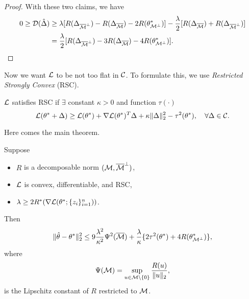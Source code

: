 \begin{proof}
    With these two claims, we have
    \begin{equation}
    \begin{split}
    0 \ge \mathcal{D}({\hat\Delta}) & \ge \lambda[R(\Delta_{{\overline{\mathcal{M}}}^\perp})-R(\Delta_{{\overline{\mathcal{M}}}})-2R(\theta^*_{\mathcal{M}^\perp})]
        -\frac{\lambda}{2}[R(\Delta_{{\overline{\mathcal{M}}}})+R(\Delta_{{\overline{\mathcal{M}}}^\perp})]  \\
    & = \frac{\lambda}{2}[R(\Delta_{{\overline{\mathcal{M}}}^\perp})-3R(\Delta_{{\overline{\mathcal{M}}}})-4R(\theta^*_{\mathcal{M}^\perp})].
    \end{split}
    \end{equation}
\end{proof}

Now we want $\mathcal{L}$ to be not too flat in $\mathcal{C}$.
To formulate this, we use \emph{Restricted Strongly Convex} (RSC).

\begin{define}
    $\mathcal{L}$ satisfies RSC
    if $\exists$ constant $\kappa > 0$ and function $\tau(\cdot)$
    \st
    \begin{equation}
        \mathcal{L}(\theta^*+\Delta)\ge \mathcal{L}(\theta^*) + \nabla \mathcal{L}(\theta^*)^T\Delta + \kappa\|\Delta\|_2^2-\tau^2(\theta^*),\quad \forall \Delta\in\mathcal{C}.
    \end{equation}
\end{define}

Here comes the main theorem.

\begin{thm}
Suppose
\begin{itemize}
    \item $R$ is a decomposable norm \wrt $(\mathcal{M}, {\overline{\mathcal{M}}}^\perp)$,
    \item $\mathcal{L}$ is convex, differentiable, and RSC,
    \item $\lambda\ge 2R^*(\nabla\mathcal{L}(\theta^*;\{z_i\}_{i=1}^n))$.
\end{itemize}
Then
\begin{equation}
    \|{\hat{\theta}}-\theta^*\|_2^2\le 9\frac{\lambda^2}{\kappa^2}\Psi^2({\overline{\mathcal{M}}})
        + \frac{\lambda}{\kappa}\{2\tau^2(\theta^*)+4R(\theta^*_{\mathcal{M}^\perp})\},
\end{equation}
where
\begin{equation}
    \Psi(\mathcal{M})=\sup_{u\in\mathcal{M}\backslash\{0\}}\frac{R(u)}{\|u\|_2},
\end{equation}
is the Lipschitz constant of $R$ restricted to $\mathcal{M}$.
\end{thm}

